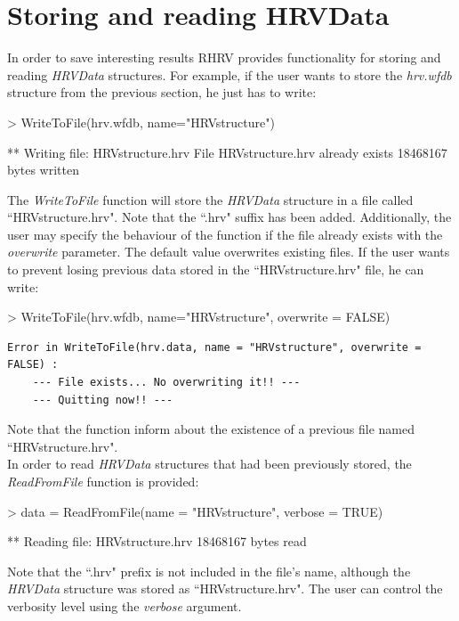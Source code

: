 \documentclass[12pt,lot, lof]{puthesis}
\begin{document}
\section{Storing and reading HRVData}
In order to save interesting results RHRV provides functionality
for storing and reading \textit{HRVData} structures. For example, if the user 
wants to store the \textit{hrv.wfdb}
structure from the previous section, he just has to write:
\begin{Schunk}
\begin{Sinput}
> WriteToFile(hrv.wfdb, name="HRVstructure")
\end{Sinput}
\begin{Soutput}
** Writing file: HRVstructure.hrv 
   File HRVstructure.hrv already exists
   18468167 bytes written
\end{Soutput}
\end{Schunk}
The \textit{WriteToFile} function will store the \textit{HRVData} structure in 
a file called
``HRVstructure.hrv". Note that the ``.hrv" suffix has been added. Additionally, 
the user may specify
the behaviour of the function if the file already exists with the 
\textit{overwrite} parameter. The default
value overwrites existing files. If the user wants to prevent losing previous 
data stored in the
``HRVstructure.hrv" file, he can write:
\begin{Schunk}
\begin{Sinput}
> WriteToFile(hrv.wfdb, name="HRVstructure", overwrite = FALSE)
\end{Sinput}
\end{Schunk}
\begin{verbatim}
Error in WriteToFile(hrv.data, name = "HRVstructure", overwrite = FALSE) : 
    --- File exists... No overwriting it!! ---
    --- Quitting now!! ---
\end{verbatim}
Note that the function inform about the existence of a previous file named 
``HRVstructure.hrv".\\

In order to read \textit{HRVData} structures that had been previously stored, 
the \textit{ReadFromFile} function is provided:
\begin{Schunk}
\begin{Sinput}
> data = ReadFromFile(name = "HRVstructure", verbose = TRUE)
\end{Sinput}
\begin{Soutput}
** Reading file: HRVstructure.hrv 
   18468167 bytes read
\end{Soutput}
\end{Schunk}
Note that the ``.hrv" prefix is not included in the file's name, although the 
\textit{HRVData} structure was  stored as ``HRVstructure.hrv". The user can 
control the verbosity level using the \textit{verbose} argument.
\singlespacing

\end{document}
